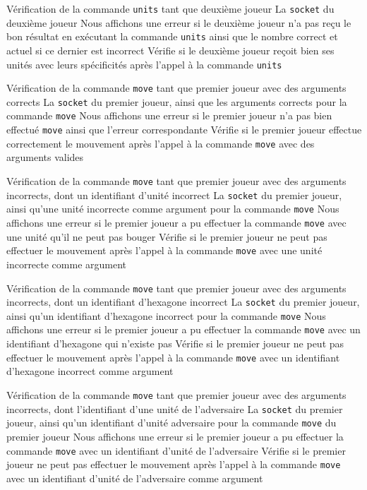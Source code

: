 \mytest
{Vérification de la commande {\tt units} tant que deuxième joueur}
{La {\tt socket} du deuxième joueur}
{Nous affichons une erreur si le deuxième joueur n'a pas reçu le bon résultat en exécutant la commande {\tt units} ainsi que le nombre correct et actuel si ce dernier est incorrect}
{Vérifie si le deuxième joueur reçoit bien ses unités avec leurs spécificités après l'appel à la commande {\tt units}}

\mytest
{Vérification de la commande {\tt move} tant que premier joueur avec des arguments corrects}
{La {\tt socket} du premier joueur, ainsi que les arguments corrects pour la commande {\tt move}}
{Nous affichons une erreur si le premier joueur n'a pas bien effectué {\tt move} ainsi que l'erreur correspondante}
{Vérifie si le premier joueur effectue correctement le mouvement après l'appel à la commande {\tt move} avec des arguments valides}

\mytest
{Vérification de la commande {\tt move} tant que premier joueur avec des arguments incorrects, dont un identifiant d'unité incorrect}
{La {\tt socket} du premier joueur, ainsi qu'une unité incorrecte comme argument pour la commande {\tt move}}
{Nous affichons une erreur si le premier joueur a pu effectuer la commande {\tt move} avec une unité qu'il ne peut pas bouger}
{Vérifie si le premier joueur ne peut pas effectuer le mouvement après l'appel à la commande {\tt move} avec une unité incorrecte comme argument}

\mytest
{Vérification de la commande {\tt move} tant que premier joueur avec des arguments incorrects, dont un identifiant d'hexagone incorrect}
{La {\tt socket} du premier joueur, ainsi qu'un identifiant d'hexagone incorrect pour la commande {\tt move}}
{Nous affichons une erreur si le premier joueur a pu effectuer la commande {\tt move} avec un identifiant d'hexagone qui n'existe pas}
{Vérifie si le premier joueur ne peut pas effectuer le mouvement après l'appel à la commande {\tt move} avec un identifiant d'hexagone incorrect comme argument}

\mytest
{Vérification de la commande {\tt move} tant que premier joueur avec des arguments incorrects, dont l'identifiant d'une unité de l'adversaire}
{La {\tt socket} du premier joueur, ainsi qu'un identifiant d'unité adversaire pour la commande {\tt move} du premier joueur}
{Nous affichons une erreur si le premier joueur a pu effectuer la commande {\tt move} avec un identifiant d'unité de l'adversaire}
{Vérifie si le premier joueur ne peut pas effectuer le mouvement après l'appel à la commande {\tt move} avec un identifiant d'unité de l'adversaire comme argument}

